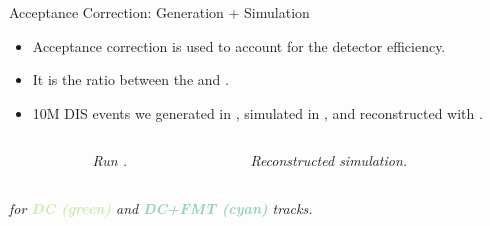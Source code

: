 \begin{frame}{Acceptance Correction: Generation + Simulation}
    \label{11.51::introduction}

    \begin{itemize}
        \item
            Acceptance correction is used to account for the detector efficiency.

        \item
            It is the ratio between the  and .

        \item
            10M DIS events we generated in , simulated in , and reconstructed with .
    \end{itemize}

    \vspace{-12pt}

    \begin{columns}[onlytextwidth,T]

    \begin{column}{.05\linewidth}\end{column} %

    \begin{column}{.35\linewidth}
        \begin{center}
            \begin{figure}[t]
                \scriptsize{\textit{Run .}}
            \end{figure}
        \end{center}
    \end{column}

    \begin{column}{.35\linewidth}
        \begin{center}
            \begin{figure}[t]
                \scriptsize{\textit{Reconstructed simulation.}}
            \end{figure}
        \end{center}
    \end{column}

    \begin{column}{.05\linewidth}\end{column} %

    \end{columns}

    \begin{center}
        \scriptsize{\textit{
             for \textbf{\textcolor[HTML]{c7eca6}{DC (green)}} and \textbf{\textcolor[HTML]{8dcfbf}{DC+FMT (cyan)}} tracks.
        }}
    \end{center}
\end{frame}

